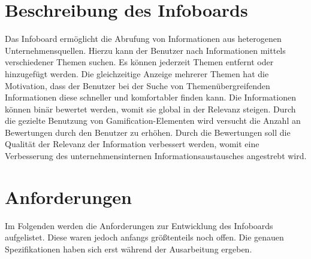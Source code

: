 \documentclass[12pt,twoside]{book}
\begin{document}
\section{Beschreibung des Infoboards}

Das Infoboard ermöglicht die Abrufung von Informationen aus heterogenen Unternehmensquellen. Hierzu kann der Benutzer nach Informationen mittels verschiedener Themen suchen. Es können jederzeit Themen entfernt oder hinzugefügt werden. Die gleichzeitige Anzeige mehrerer Themen hat die Motivation, dass der Benutzer bei der Suche von Themenübergreifenden Informationen diese schneller und komfortabler finden kann.
Die Informationen können binär bewertet werden, womit sie global in der Relevanz steigen.
Durch die gezielte Benutzung von Gamification-Elementen wird versucht die Anzahl an Bewertungen durch den Benutzer zu erhöhen.
Durch die Bewertungen soll die Qualität der Relevanz der Information verbessert werden, womit eine Verbesserung des unternehmensinternen Informationsaustausches angestrebt wird.


\section{Anforderungen}

Im Folgenden werden die Anforderungen zur Entwicklung des Infoboards aufgelistet. Diese waren jedoch anfangs größtenteils noch offen. Die genauen Spezifikationen haben sich erst während der Ausarbeitung ergeben.
\end{document}
